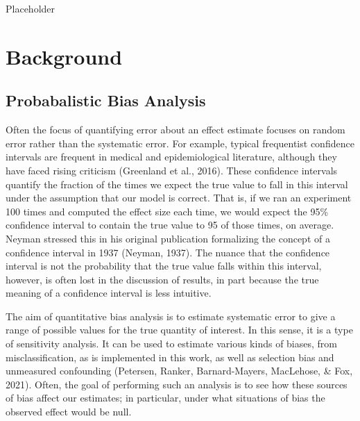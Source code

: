 \documentclass[12pt,twoside]{smiththesis}
\begin{document}
Placeholder

\hypertarget{background}{%
\chapter{Background}\label{background}}

\hypertarget{probabalistic-bias-analysis}{%
\section{Probabalistic Bias Analysis}\label{probabalistic-bias-analysis}}

Often the focus of quantifying error about an effect estimate focuses on random error rather than the systematic error. For example, typical frequentist confidence intervals are frequent in medical and epidemiological literature, although they have faced rising criticism (Greenland et al., 2016). These confidence intervals quantify the fraction of the times we expect the true value to fall in this interval under the assumption that our model is correct. That is, if we ran an experiment 100 times and computed the effect size each time, we would expect the 95\% confidence interval to contain the true value to 95 of those times, on average. Neyman stressed this in his original publication formalizing the concept of a confidence interval in 1937 (Neyman, 1937). The nuance that the confidence interval is not the probability that the true value falls within this interval, however, is often lost in the discussion of results, in part because the true meaning of a confidence interval is less intuitive.

The aim of quantitative bias analysis is to estimate systematic error to give a range of possible values for the true quantity of interest. In this sense, it is a type of sensitivity analysis. It can be used to estimate various kinds of biases, from misclassification, as is implemented in this work, as well as selection bias and unmeasured confounding (Petersen, Ranker, Barnard-Mayers, MacLehose, \& Fox, 2021). Often, the goal of performing such an analysis is to see how these sources of bias affect our estimates; in particular, under what situations of bias the observed effect would be null.
\end{document}
